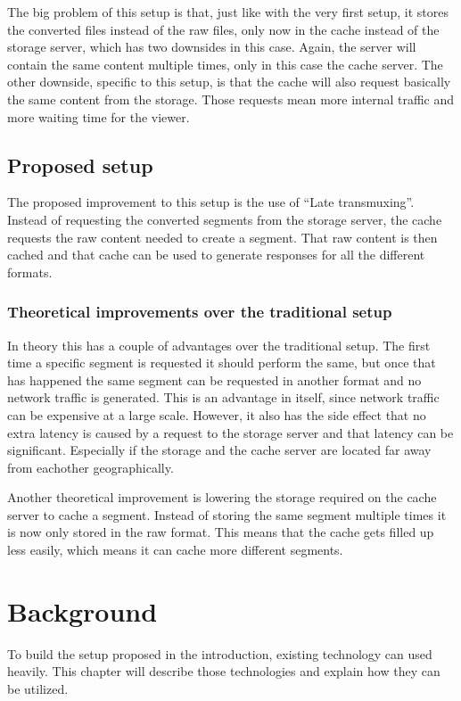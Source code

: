 \documentclass[twoside,openright]{uva-bachelor-thesis}
\begin{document}
The big problem of this setup is that, just like with the very first setup, it
stores the converted files instead of the raw files, only now in the cache
instead of the storage server, which has two downsides in this case. Again, the
server will contain the same content multiple times, only in this case the cache
server. The other downside, specific to this setup, is that the cache will also
request basically the same content from the storage. Those requests mean more
internal traffic and more waiting time for the viewer.

\section{Proposed setup}
The proposed improvement to this setup is the use of ``Late transmuxing''.
Instead of requesting the converted segments from the storage server, the cache
requests the raw content needed to create a segment. That raw content is then
cached and that cache can be used to generate responses for all the different
formats.

\subsection{Theoretical improvements over the traditional setup}
In theory this has a couple of advantages over the traditional setup. The first
time a specific segment is requested it should perform the same, but once that
has happened the same segment can be requested in another format and no network
traffic is generated. This is an advantage in itself, since network traffic can
be expensive at a large scale. However, it also has the side effect that no
extra latency is caused by a request to the storage server and that latency can
be significant. Especially if the storage and the cache server are located
far away from eachother geographically.

Another theoretical improvement is lowering the storage required on the cache
server to cache a segment. Instead of storing the same segment multiple times it
is now only stored in the raw format. This means that the cache gets filled up
less easily, which means it can cache more different segments.








\chapter{Background}
To build the setup proposed in the introduction, existing technology can used
heavily. This chapter will describe those technologies and explain how they can
be utilized.
\end{document}
